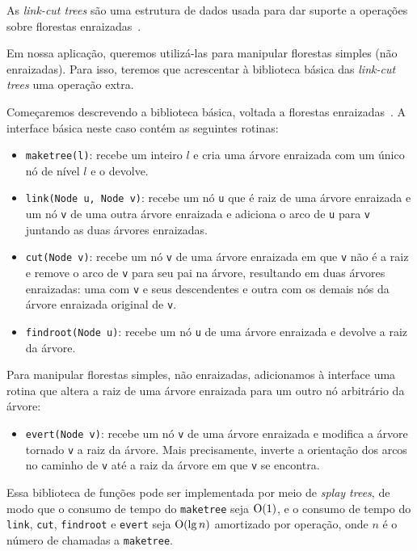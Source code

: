 As \emph{link-cut trees} são uma estrutura de dados usada para dar suporte a operações sobre florestas enraizadas~\cite{DemaineHJSI2012}.  

Em nossa aplicação, queremos utilizá-las para manipular florestas simples (não enraizadas). Para isso, teremos que acrescentar à biblioteca
básica das \emph{link-cut trees} uma operação extra.  

Começaremos descrevendo a biblioteca básica, voltada a florestas enraizadas~\cite{RamchandraCODEFORCE}. A interface básica neste caso contém as seguintes rotinas:  

\begin{itemize}
    \item \texttt{maketree(l)}: {\color{red}recebe um inteiro $l$ e} cria uma árvore enraizada com um único nó {\color{red}de nível $l$} e o devolve.  

    \item \texttt{link(Node u, Node v)}: recebe um nó \texttt{u} que é raiz de uma árvore enraizada e um nó \texttt{v} de uma outra árvore enraizada e adiciona o arco de \texttt{u} para \texttt{v} juntando as duas árvores enraizadas.

    \item \texttt{cut(Node v)}: recebe um nó \texttt{v} de uma árvore enraizada em que \texttt{v} não é a raiz e remove o arco de \texttt{v} para seu pai na árvore, resultando em duas árvores enraizadas: uma com \texttt{v} e seus descendentes e outra com os demais nós da árvore enraizada original de \texttt{v}.

    \item \texttt{findroot(Node u)}: recebe um nó \texttt{u} de uma árvore enraizada e devolve a raiz da árvore.
\end{itemize}

Para manipular florestas simples, não enraizadas, adicionamos à interface uma rotina que altera a raiz de uma árvore enraizada para um outro nó arbitrário da árvore:  

\begin{itemize}
    \item \texttt{evert(Node v)}: recebe um nó \texttt{v} de uma árvore enraizada e modifica a árvore tornado \texttt{v} a raiz da árvore. Mais precisamente, inverte a orientação dos arcos no caminho de \texttt{v} até a raiz da árvore em que \texttt{v} se encontra.
\end{itemize}

Essa biblioteca de funções pode ser implementada por meio de \emph{splay trees}, de modo que o consumo de tempo do \texttt{maketree} seja $\mathrm{O}(1)$, e o consumo de tempo do \texttt{link}, \texttt{cut}, \texttt{findroot} e \texttt{evert} seja $\mathrm{O}(\lg n)$ amortizado por operação, onde $n$ é o número de chamadas a \texttt{maketree}.  

